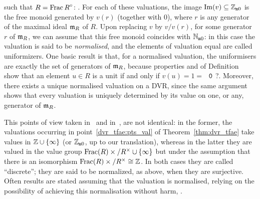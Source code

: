 \documentclass[sigplan,10pt,anonymous,review]{acmart}
\begin{document}
such that $R={\operatorname{Frac} R}^\circ$: . For each of these valuations, the image $\operatorname{Im}(v)\subseteq\mathbb{Z}_{\mathtt{m}0}$ is the free monoid generated by $v(r)$ (together with $0$), where $r$ is any generator of the maximal ideal $\mathfrak{m}_{R}$ of $R$. Upon replacing $v$ by $v/v(r)$, for some generator $r$ of $\mathfrak{m}_{R}$, we can assume that this free monoid coincides with $\mathbb{N}_{\mathtt{m}0}$: in this case the valuation is said to be \emph{normalised}, and the elements of valuation equal are called uniformizers. One basic result is that, for a normalised valuation, the uniformisers are exactly the set of generators of $\mathfrak{m}_{R}$, because properties \label{def_valuation:one} and \label{def_valuation:one} of Definition~\label{def:valuation} show that an element $u\in R$ is a unit if and only if $v(u)=1=$ $\mathtt{\ 0\ }$?. Moreover, there exists a unique normalised valuation on a DVR, since the same argument shows that every valuation is uniquely determined by its value on one, or any, generator of $\mathfrak{m}_{R}$. %

This points of view taken in~\cite[Chapitre~I]{Ser62} and in~\cite[Chapitre~VI, \S3, n$^\circ$ 6]{Bou85}, are not identical: in the former, the valuations occurring in point~\ref{dvr_tfae:pts_val} of Theorem~\ref{thm:dvr_tfae} take values in $\mathbb{Z}\cup\{\infty\}$ (or $\mathbb{Z}_{\mathtt{m}0}$, up to our translation), whereas in the latter they are valued in the value group $\operatorname{Frac}(R)\times/R^\times \cup\{\infty\}$ but under the assumption that there is an isomorphism $\operatorname{Frac}(R)\times/R^\times\cong \mathbb{Z}$. In both cases they are called ``discrete''; they are said to be normalized, as above, when they are surjective. Often results are stated assuming that the valuation is normalised, relying on the possibility of achieving this normalisation without harm, .
\end{document}
